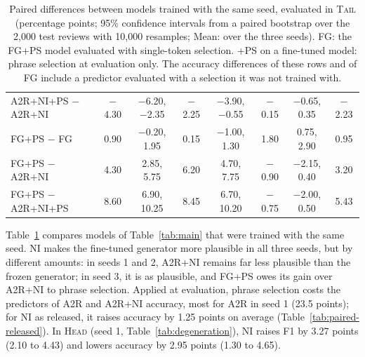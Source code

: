\documentclass[11pt]{article}
\newcommand{\HEAD}{\textup{\textsc{Head}}}
\newcommand{\TAIL}{\textup{\textsc{Tail}}}
\begin{document}
\begin{table}[t]
\begin{tabular}{@{}lccccccc@{}}
A2R+NI+PS $-$ A2R+NI & $-$4.30 & $-$6.20, $-$2.35 & $-$2.25 & $-$3.90, $-$0.55 & $-$0.15 & $-$0.65, 0.35 & $-$2.23 \\
FG+PS $-$ FG & 0.90 & $-$0.20, 1.95 & 0.15 & $-$1.00, 1.30 & 1.80 & 0.75, 2.90 & 0.95 \\
\addlinespace
FG+PS $-$ A2R+NI & 4.30 & 2.85, 5.75 & 6.20 & 4.70, 7.75 & $-$0.90 & $-$2.15, 0.40 & 3.20 \\
FG+PS $-$ A2R+NI+PS & 8.60 & 6.90, 10.25 & 8.45 & 6.70, 10.20 & $-$0.75 & $-$2.00, 0.50 & 5.43 \\
\bottomrule
\end{tabular}
\caption{Paired differences between models trained with the same seed, evaluated in \TAIL{} (percentage points; 95\% confidence intervals from a paired bootstrap over the 2,000 test reviews with 10,000 resamples; Mean: over the three seeds). FG: the FG+PS model evaluated with single-token selection. +PS on a fine-tuned model: phrase selection at evaluation only. The accuracy differences of these rows and of FG include a predictor evaluated with a selection it was not trained with.}
\label{tab:paired}
\end{table}

Table~\ref{tab:paired} compares models of Table~\ref{tab:main} that were trained with the same seed. NI makes the fine-tuned generator more plausible in all three seeds, but by different amounts: in seeds 1 and 2, A2R+NI remains far less plausible than the frozen generator; in seed 3, it is as plausible, and FG+PS owes its gain over A2R+NI to phrase selection. Applied at evaluation, phrase selection costs the predictors of A2R and A2R+NI accuracy, most for A2R in seed 1 (23.5 points); for NI as released, it raises accuracy by 1.25 points on average (Table~\ref{tab:paired-released}). In \HEAD{} (seed 1, Table~\ref{tab:degeneration}), NI raises F1 by 3.27 points (2.10 to 4.43) and lowers accuracy by 2.95 points (1.30 to 4.65).
\end{document}
